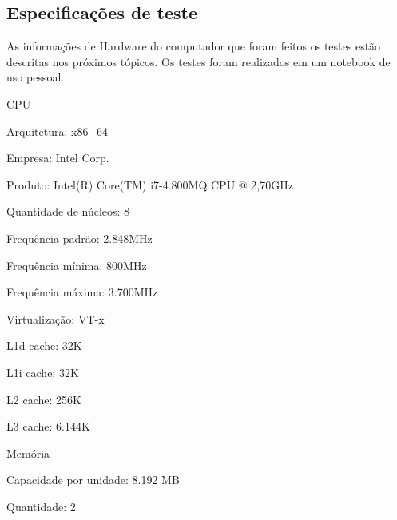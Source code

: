 \subsection{Especificações de teste}

As informações de Hardware
do computador que foram feitos os testes estão descritas nos próximos tópicos.
Os testes foram realizados em um notebook de uso pessoal.

\begin{alineas}

  \item CPU

  \begin{alineas}

     \item Arquitetura: x86\_64

     \item Empresa: Intel Corp.

     \item Produto: Intel(R) Core(TM) i7-4.800MQ CPU @ 2,70GHz

     \item Quantidade de núcleos: 8

     \item Frequência padrão: 2.848MHz

     \item Frequência mínima:  800MHz

     \item Frequência máxima: 3.700MHz

     \item Virtualização: VT-x

     \item L1d cache: 32K

     \item L1i cache: 32K

     \item L2 cache: 256K

     \item L3 cache: 6.144K

  \end{alineas}

  \item Memória

  \begin{alineas}

     \item Capacidade por unidade: 8.192 MB

     \item Quantidade: 2


\end{alineas}
\end{alineas}
